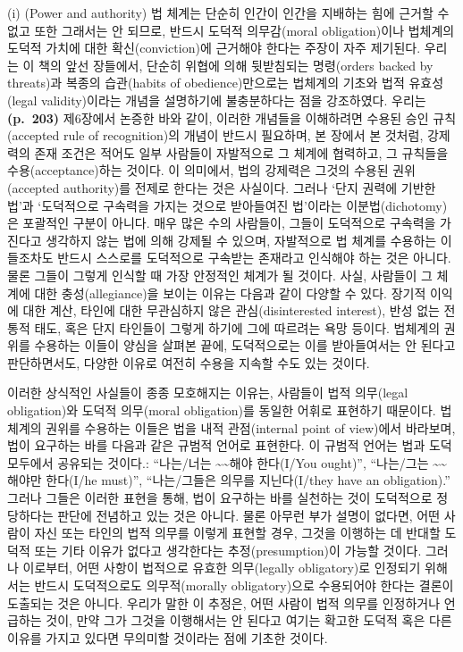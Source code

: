  (i)  (Power and authority) 법 체계는 단순히 인간이
인간을 지배하는 힘에 근거할 수 없고 또한 그래서는 안 되므로, 반드시
도덕적 의무감(moral obligation)이나 법체계의 도덕적 가치에 대한
확신(conviction)에 근거해야 한다는 주장이 자주 제기된다. 우리는 이
책의 앞선 장들에서, 단순히 위협에 의해 뒷받침되는 명령(orders backed
by threats)과 복종의 습관(habits of obedience)만으로는 법체계의 기초와
법적 유효성(legal validity)이라는 개념을 설명하기에 불충분하다는 점을
강조하였다. 우리는 \textbf{(p.~203)} 제6장에서 논증한 바와 같이,
이러한 개념들을 이해하려면 수용된 승인 규칙(accepted rule of
recognition)의 개념이 반드시 필요하며, 본 장에서 본 것처럼, 강제력의
존재 조건은 적어도 일부 사람들이 자발적으로 그 체계에 협력하고, 그
규칙들을 수용(acceptance)하는 것이다. 이 의미에서, 법의 강제력은
그것의 수용된 권위(accepted authority)를 전제로 한다는 것은 사실이다.
그러나 `단지 권력에 기반한 법'과 `도덕적으로 구속력을 가지는 것으로
받아들여진 법'이라는 이분법(dichotomy)은 포괄적인 구분이 아니다. 매우
많은 수의 사람들이, 그들이 도덕적으로 구속력을 가진다고 생각하지 않는
법에 의해 강제될 수 있으며, 자발적으로 법 체계를 수용하는 이들조차도
반드시 스스로를 도덕적으로 구속받는 존재라고 인식해야 하는 것은
아니다. 물론 그들이 그렇게 인식할 때 가장 안정적인 체계가 될 것이다.
사실, 사람들이 그 체계에 대한 충성(allegiance)을 보이는 이유는 다음과
같이 다양할 수 있다. 장기적 이익에 대한 계산, 타인에 대한 무관심하지
않은 관심(disinterested interest), 반성 없는 전통적 태도, 혹은 단지
타인들이 그렇게 하기에 그에 따르려는 욕망 등이다. 법체계의 권위를
수용하는 이들이 양심을 살펴본 끝에, 도덕적으로는 이를 받아들여서는 안
된다고 판단하면서도, 다양한 이유로 여전히 수용을 지속할 수도 있는
것이다.

이러한 상식적인 사실들이 종종 모호해지는 이유는, 사람들이 법적
의무(legal obligation)와 도덕적 의무(moral obligation)를 동일한 어휘로
표현하기 때문이다. 법체계의 권위를 수용하는 이들은 법을 내적
관점(internal point of view)에서 바라보며, 법이 요구하는 바를 다음과
같은 규범적 언어로 표현한다. 이 규범적 언어는 법과 도덕 모두에서
공유되는 것이다.: ``나는/너는 \textasciitilde\textasciitilde 해야
한다(I/You ought)'', ``나는/그는 \textasciitilde\textasciitilde 해야만
한다(I/he must)'', ``나는/그들은 의무를 지닌다(I/they have an
obligation).'' 그러나 그들은 이러한 표현을 통해, 법이 요구하는 바를
실천하는 것이 도덕적으로 정당하다는  판단에 전념하고 있는
것은 아니다. 물론 아무런 부가 설명이 없다면, 어떤 사람이 자신 또는
타인의 법적 의무를 이렇게 표현할 경우, 그것을 이행하는 데 반대할 도덕적
또는 기타 이유가 없다고 생각한다는 추정(presumption)이 가능할 것이다.
그러나 이로부터, 어떤 사항이 법적으로 유효한 의무(legally obligatory)로
인정되기 위해서는 반드시 도덕적으로도 의무적(morally obligatory)으로
수용되어야 한다는 결론이 도출되는 것은 아니다. 우리가 말한 이 추정은,
어떤 사람이 법적 의무를 인정하거나 언급하는 것이, 만약 그가 그것을
이행해서는 안 된다고 여기는 확고한 도덕적 혹은 다른 이유를 가지고 있다면
무의미할 것이라는 점에 기초한 것이다.

